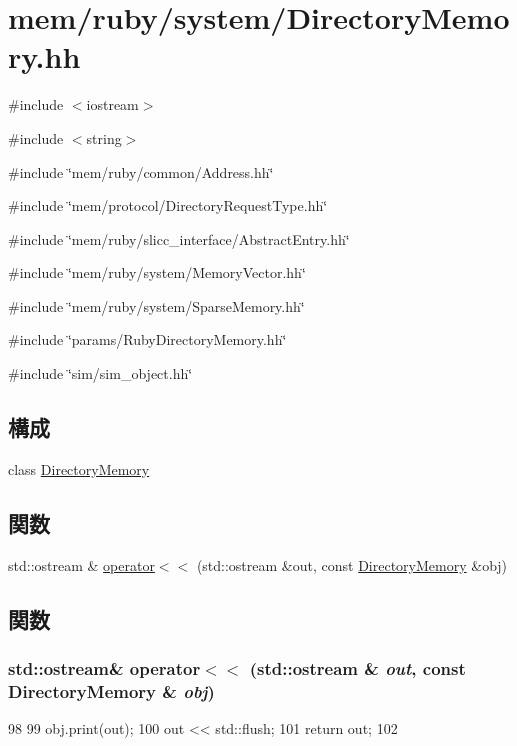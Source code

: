 \hypertarget{DirectoryMemory_8hh}{
\section{mem/ruby/system/DirectoryMemory.hh}
\label{DirectoryMemory_8hh}
}
{\ttfamily \#include $<$iostream$>$}\par
{\ttfamily \#include $<$string$>$}\par
{\ttfamily \#include \char`\"{}mem/ruby/common/Address.hh\char`\"{}}\par
{\ttfamily \#include \char`\"{}mem/protocol/DirectoryRequestType.hh\char`\"{}}\par
{\ttfamily \#include \char`\"{}mem/ruby/slicc\_\-interface/AbstractEntry.hh\char`\"{}}\par
{\ttfamily \#include \char`\"{}mem/ruby/system/MemoryVector.hh\char`\"{}}\par
{\ttfamily \#include \char`\"{}mem/ruby/system/SparseMemory.hh\char`\"{}}\par
{\ttfamily \#include \char`\"{}params/RubyDirectoryMemory.hh\char`\"{}}\par
{\ttfamily \#include \char`\"{}sim/sim\_\-object.hh\char`\"{}}\par
\subsection*{構成}
\begin{DoxyCompactItemize}
\item 
class \hyperlink{classDirectoryMemory}{DirectoryMemory}
\end{DoxyCompactItemize}
\subsection*{関数}
\begin{DoxyCompactItemize}
\item 
std::ostream \& \hyperlink{DirectoryMemory_8hh_ad0c548d15601432022e0eece2cd9385b}{operator$<$$<$} (std::ostream \&out, const \hyperlink{classDirectoryMemory}{DirectoryMemory} \&obj)
\end{DoxyCompactItemize}


\subsection{関数}
\hypertarget{DirectoryMemory_8hh_ad0c548d15601432022e0eece2cd9385b}{
\subsubsection[{operator$<$$<$}]{\setlength{\rightskip}{0pt plus 5cm}std::ostream\& operator$<$$<$ (std::ostream \& {\em out}, \/  const {\bf DirectoryMemory} \& {\em obj})}}
\label{DirectoryMemory_8hh_ad0c548d15601432022e0eece2cd9385b}



\begin{DoxyCode}
98 {
99     obj.print(out);
100     out << std::flush;
101     return out;
102 }
\end{DoxyCode}
